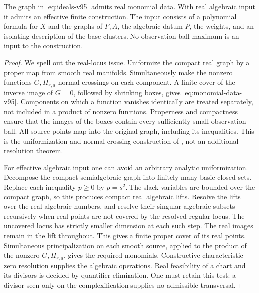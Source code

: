 \begin{lemma}\label{lem:real-cover-v95}
The graph in \eqref{eq:ideals-v95} admits real monomial data. With real
algebraic input it admits an effective finite construction. The input
consists of a polynomial formula for $X$ and the graphs of $F,A$, the
algebraic datum $P$, the weights, and an isolating description of the
base clusters. No observation-ball maximum is an input to the construction.
\end{lemma}
\begin{proof}
We spell out the real-locus issue. Uniformize the compact real graph by a
proper map from smooth real manifolds. Simultaneously make the nonzero
functions $G,H_{r,a}$ normal crossings on each component. A finite cover
of the inverse image of $G=0$, followed by shrinking boxes, gives
\eqref{eq:monomial-data-v95}. Components on which a function vanishes
identically are treated separately, not included in a product of
nonzero functions. Properness and compactness ensure that the images of
the boxes contain every sufficiently small observation ball. All source
points map into the original graph, including its inequalities. This is
the uniformization and normal-crossing construction of
\cite{v95BM88}, not an additional resolution theorem.

For effective algebraic input one can avoid an arbitrary analytic
uniformization. Decompose the compact semialgebraic graph into finitely
many basic closed sets. Replace each inequality $p\ge0$ by
$p=s^2$. The slack variables are bounded over the compact graph, so this
produces compact real algebraic lifts. Resolve the lifts over the real
algebraic numbers, and resolve their singular algebraic subsets
recursively when real points are not covered by the resolved regular
locus. The uncovered locus has strictly smaller dimension at each such
step. The real images remain in the lift throughout. This gives a finite
proper cover of its real points. Simultaneous principalization on each
smooth source, applied to the product of the nonzero $G,H_{r,a}$, gives
the required monomials. Constructive characteristic-zero resolution
\cite{v95BM97} supplies the algebraic operations. Real feasibility of a
chart and its divisors is decided by quantifier elimination. One must
retain this test: a divisor seen only on the complexification supplies
no admissible transversal.
\end{proof}

